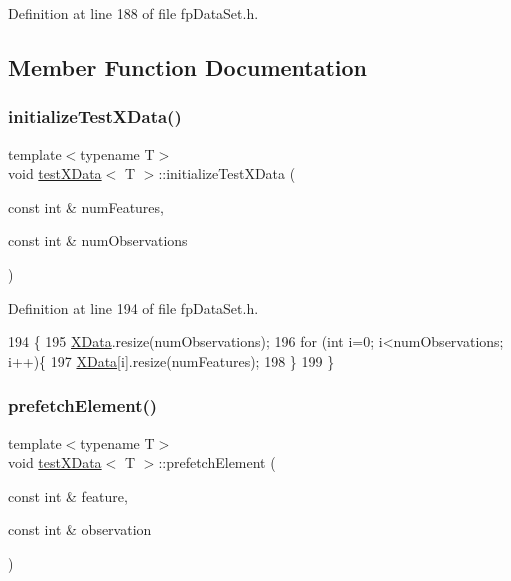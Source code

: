 Definition at line 188 of file fp\+Data\+Set.\+h.



\subsection{Member Function Documentation}
\mbox{\label{classtestXData_a198eae2889a3477c6a59038e54fc0e72}} 
\subsubsection{\texorpdfstring{initialize\+Test\+X\+Data()}{initializeTestXData()}}
{\footnotesize\ttfamily template$<$typename T$>$ \\
void \hyperlink{classtestXData}{test\+X\+Data}$<$ T $>$\+::initialize\+Test\+X\+Data (\begin{DoxyParamCaption}\item[{const int \&}]{num\+Features,  }\item[{const int \&}]{num\+Observations }\end{DoxyParamCaption})\hspace{0.3cm}{\ttfamily [inline]}}



Definition at line 194 of file fp\+Data\+Set.\+h.


\begin{DoxyCode}
194                                                                                      \{
195             \hyperlink{classtestXData_aabb02eb5f97c674d6a88c8194498b621}{XData}.resize(numObservations);
196             \textcolor{keywordflow}{for} (\textcolor{keywordtype}{int} i=0; i<numObservations; i++)\{
197                 \hyperlink{classtestXData_aabb02eb5f97c674d6a88c8194498b621}{XData}[i].resize(numFeatures);
198             \}
199         \}
\end{DoxyCode}
\mbox{\label{classtestXData_a04843e072396cac0fb8f3417b9dd3f22}} 
\subsubsection{\texorpdfstring{prefetch\+Element()}{prefetchElement()}}
{\footnotesize\ttfamily template$<$typename T$>$ \\
void \hyperlink{classtestXData}{test\+X\+Data}$<$ T $>$\+::prefetch\+Element (\begin{DoxyParamCaption}\item[{const int \&}]{feature,  }\item[{const int \&}]{observation }\end{DoxyParamCaption})\hspace{0.3cm}{\ttfamily [inline]}}



